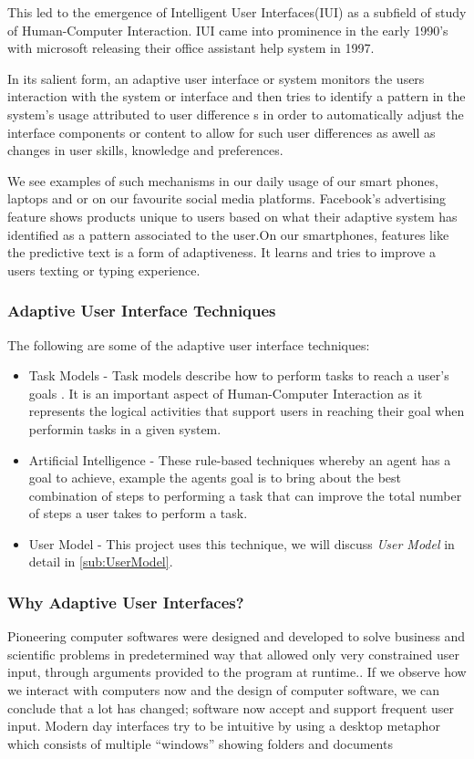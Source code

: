This led to the emergence of Intelligent User Interfaces(IUI) as a subfield of study of Human-Computer Interaction. IUI came into prominence in the early 1990's with microsoft releasing their office assistant help system in 1997.

In its salient form, an adaptive user interface or system monitors the users interaction with the system or interface and then tries to identify a pattern in the system's usage attributed to user difference s in order to automatically adjust the interface components or content to allow for such user differences as awell as changes in user skills, knowledge and preferences.

We see examples of such mechanisms in our daily usage of our smart phones, laptops and or on our favourite social media platforms. Facebook's advertising feature shows products unique to users based on what their adaptive system has identified as a pattern associated to the user.On our smartphones, features like the predictive text is a form of adaptiveness. It learns and tries to improve a users texting or typing experience.

\subsubsection{Adaptive User Interface Techniques}
The following are some of the adaptive user interface techniques:
\begin{itemize}
    \item Task Models - Task models describe how to perform tasks to reach a user's goals \cite{website:Task-Models}. It is an important aspect of Human-Computer Interaction as it represents the logical activities that support users in reaching their goal when performin tasks in a given system.
    \item Artificial Intelligence - These rule-based techniques whereby an agent has a goal to achieve, example the agents goal is to bring about the best combination of steps to performing a task that can improve the total number of steps a user takes to perform a task.
    \item User Model - This project uses this technique, we will discuss \emph{User Model} in detail in \ref{sub:UserModel}.
\end{itemize}


\subsubsection{Why Adaptive User Interfaces?}
Pioneering computer softwares were designed and developed to solve business and scientific problems in predetermined way that allowed only very constrained user input, through arguments provided to the program at runtime.\cite{langley1997machine}.
If we observe how we interact with computers now and the design of computer software, we can conclude that a lot has changed; software now accept and support frequent user input. Modern day interfaces try to be intuitive by using a desktop metaphor which consists of multiple ``windows'' showing folders and documents \cite{patrick2003intelligent}

